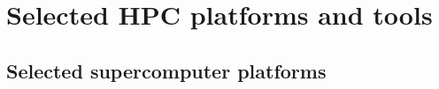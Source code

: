 \chapter{Selected HPC platforms and tools}
\label{chapter:selected-HPC-platforms}


\section{Selected supercomputer platforms}

% 
% 
% 
% 
% 
% 
% 
% 
% 
